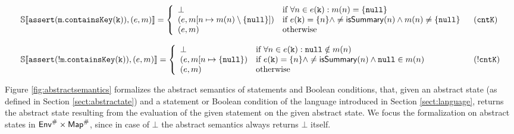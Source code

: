 \begin{figure*}
\[\begin{array}{ll}
\mathbb{S}\llbracket \mathtt{assert(m.containsKey(k))}, (e, m) \rrbracket = \left\{
\begin{array}{ll}
\bot & \textrm{if } \forall n \in e(\mathtt{k}) : m(n)=\{\mathtt{null}\}\\
(e, m[n \mapsto m(n)\setminus\{\mathtt{null}\}]) & \textrm{if } e(\mathtt{k}) = \{n\} \land \neq \mathsf{isSummary}(n) \land m(n) \neq \{\mathtt{null}\}\\
(e, m) & \textrm{otherwise}\\
\end{array}
\right. & (\mathtt{cntK})\\
\\
\mathbb{S}\llbracket \mathtt{assert(!m.containsKey(k))}, (e, m) \rrbracket = \left\{
\begin{array}{ll}
\bot & \textrm{if } \forall n \in e(\mathtt{k}) : \mathtt{null} \notin m(n)\\
(e, m[n \mapsto \{\mathtt{null}\}) & \textrm{if } e(\mathtt{k}) = \{n\} \land \neq \mathsf{isSummary}(n) \land \mathtt{null} \in m(n)\\
(e, m) & \textrm{otherwise}\\
\end{array}
\right. & (\mathtt{!cntK})\\
\end{array}
\]
\caption{Formal definition of the abstract semantics}
\label{fig:abstractsemantics}
\end{figure*}
Figure \ref{fig:abstractsemantics} formalizes the abstract semantics of statements and Boolean conditions, that, given an abstract state (as defined in Section \ref{sect:abstractate}) and a statement or Boolean condition of the language introduced in Section \ref{sect:language}, returns the abstract state resulting from the evaluation of the given statement on the given abstract state. We focus the formalization on abstract states in $\mathsf{Env}^\# \times \mathsf{Map}^\#$, since in case of $\bot$ the abstract semantics always returns $\bot$ itself.


